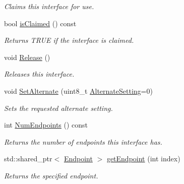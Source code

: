 \begin{DoxyCompactItemize}
\begin{DoxyCompactList}\small\item\em Claims this interface for use. \end{DoxyCompactList}\item 
\hypertarget{class_lib_u_s_b_1_1_interface_a3647afca72cc33775f2a55de354e1a99}{bool \hyperlink{class_lib_u_s_b_1_1_interface_a3647afca72cc33775f2a55de354e1a99}{is\-Claimed} () const }\label{class_lib_u_s_b_1_1_interface_a3647afca72cc33775f2a55de354e1a99}

\begin{DoxyCompactList}\small\item\em Returns T\-R\-U\-E if the interface is claimed. \end{DoxyCompactList}\item 
\hypertarget{class_lib_u_s_b_1_1_interface_a3ab6a262cc1475ea119729838aca6de6}{void \hyperlink{class_lib_u_s_b_1_1_interface_a3ab6a262cc1475ea119729838aca6de6}{Release} ()}\label{class_lib_u_s_b_1_1_interface_a3ab6a262cc1475ea119729838aca6de6}

\begin{DoxyCompactList}\small\item\em Releases this interface. \end{DoxyCompactList}\item 
\hypertarget{class_lib_u_s_b_1_1_interface_a804fe82696522bd7dee8d7629d95c24a}{void \hyperlink{class_lib_u_s_b_1_1_interface_a804fe82696522bd7dee8d7629d95c24a}{Set\-Alternate} (uint8\-\_\-t \hyperlink{class_lib_u_s_b_1_1_interface_a52b602b375dc3e53b2c6c3bafb7be3d7}{Alternate\-Setting}=0)}\label{class_lib_u_s_b_1_1_interface_a804fe82696522bd7dee8d7629d95c24a}

\begin{DoxyCompactList}\small\item\em Sets the requested alternate setting. \end{DoxyCompactList}\item 
\hypertarget{class_lib_u_s_b_1_1_interface_a80e1ca389b48139974d43f3c194f1c2a}{int \hyperlink{class_lib_u_s_b_1_1_interface_a80e1ca389b48139974d43f3c194f1c2a}{Num\-Endpoints} () const }\label{class_lib_u_s_b_1_1_interface_a80e1ca389b48139974d43f3c194f1c2a}

\begin{DoxyCompactList}\small\item\em Returns the number of endpoints this interface has. \end{DoxyCompactList}\item 
\hypertarget{class_lib_u_s_b_1_1_interface_a79d86a85d4ef11cada54bdc192a9e3b5}{std\-::shared\-\_\-ptr$<$ \hyperlink{class_lib_u_s_b_1_1_endpoint}{Endpoint} $>$ \hyperlink{class_lib_u_s_b_1_1_interface_a79d86a85d4ef11cada54bdc192a9e3b5}{get\-Endpoint} (int index)}\label{class_lib_u_s_b_1_1_interface_a79d86a85d4ef11cada54bdc192a9e3b5}

\begin{DoxyCompactList}\small\item\em Returns the specified endpoint. \end{DoxyCompactList}\end{DoxyCompactItemize}


